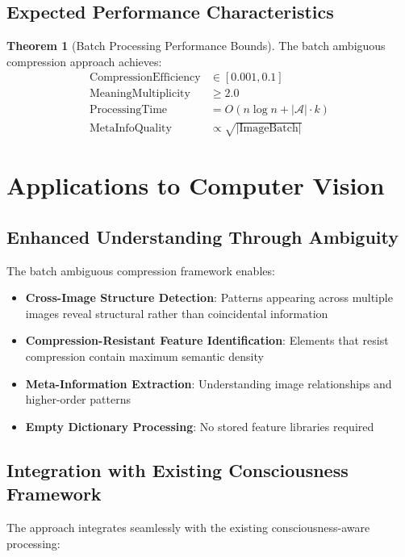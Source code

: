 \documentclass[12pt,a4paper]{article}
\theoremstyle{definition}
\newtheorem{theorem}{Theorem}
\begin{document}
\subsection{Expected Performance Characteristics}

\begin{theorem}[Batch Processing Performance Bounds]
The batch ambiguous compression approach achieves:
\begin{align}
\text{CompressionEfficiency} &\in [0.001, 0.1] \\
\text{MeaningMultiplicity} &\geq 2.0 \\
\text{ProcessingTime} &= O(n \log n + |\mathcal{A}| \cdot k) \\
\text{MetaInfoQuality} &\propto \sqrt{|\text{ImageBatch}|}
\end{align}
\end{theorem}

\section{Applications to Computer Vision}

\subsection{Enhanced Understanding Through Ambiguity}

The batch ambiguous compression framework enables:

\begin{itemize}
\item \textbf{Cross-Image Structure Detection}: Patterns appearing across multiple images reveal structural rather than coincidental information
\item \textbf{Compression-Resistant Feature Identification}: Elements that resist compression contain maximum semantic density
\item \textbf{Meta-Information Extraction}: Understanding image relationships and higher-order patterns
\item \textbf{Empty Dictionary Processing}: No stored feature libraries required
\end{itemize}

\subsection{Integration with Existing Consciousness Framework}

The approach integrates seamlessly with the existing consciousness-aware processing:
\end{document}
